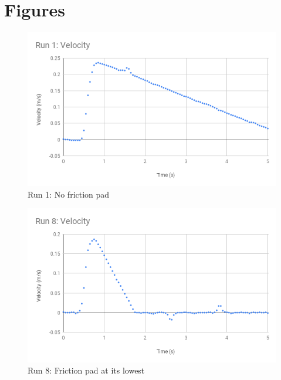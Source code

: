 \section{Figures}
\begin{figure}[ht]
    \centering
    \includegraphics[scale=0.71]{image/03-first-law/Run-1-Velocity.png}
    \caption{Run 1: No friction pad}
    \label{figure:03.run-1}
\end{figure}
\begin{figure}[ht]
    \centering
    \includegraphics[scale=0.71]{image/03-first-law/Run-8-Velocity.png}
    \caption{Run 8: Friction pad at its lowest}
    \label{figure:03.run-8}
\end{figure}
